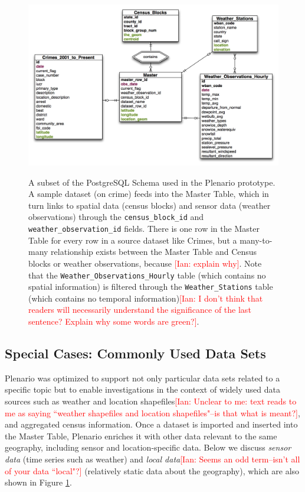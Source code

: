 \documentclass[11pt]{article}
\newcommand{\ian}[1]{\textcolor{Red}{[Ian: #1]}}
\newcommand{\ian}[1]{}
\begin{document}
\begin{figure}
	\centering
		\includegraphics[scale=.45]{db_schema.pdf}
	\label{fig:db-schema}
	\caption{A subset of the PostgreSQL Schema used in the Plenario prototype. A sample dataset (on crime) feeds into the Master Table, which in turn links to spatial data (census blocks) and sensor data (weather observations) through the \texttt{census\_block\_id} and \texttt{weather\_observation\_id} fields. There is one row in the Master Table for every row in a source dataset like Crimes, but a many-to-many relationship exists between the Master Table and Census blocks or weather observations, because \ian{explain why}. Note that the \texttt{Weather\_Observations\_Hourly} table (which contains no spatial information) is filtered through the \texttt{Weather\_Stations} table (which contains no temporal information)\ian{I don't think that readers will necessarily understand the significance of the last sentence? Explain why some words are green?}. \vspace{.4cm}}
\end{figure}

\subsection{\textbf{Special Cases: Commonly Used Data Sets}}\label{sec:commonly-used-datasets}
Plenario was optimized to support not only particular data sets related to a specific topic but to enable investigations in the context of widely used data sources such as weather and location shapefiles\ian{Unclear to me: text reads to me as saying ``weather shapefiles and location shapefiles"--is that what is meant?}, and aggregated census information. Once a dataset is imported and inserted into the Master Table, Plenario enriches it with other data relevant to the same geography, including sensor and location-specific data. Below we discuss \textit{sensor data} (time series such as weather) and \textit{local data}\ian{Seems an odd term--isn't all of your data ``local"?} (relatively static data about the geography), which are also shown in Figure \ref{fig:db-schema}.
\end{document}
